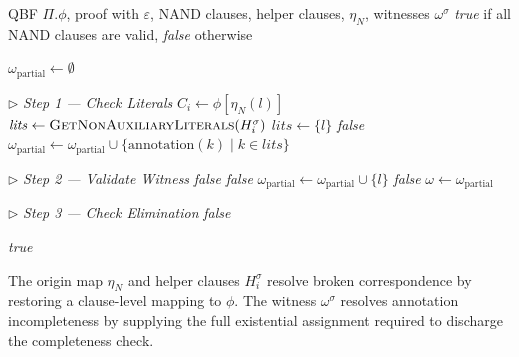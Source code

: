 \documentclass{article}
\begin{document}
\begin{algorithm}
    \caption{\textsc{CheckExpansion}}
    \begin{algorithmic}[1]
        \REQUIRE QBF $\Pi.\phi$, proof with $\varepsilon$, NAND clauses, helper
        clauses, $\eta_N$, witnesses $\omega^\sigma$
        \ENSURE \textit{true} if all NAND clauses are valid, \textit{false} otherwise


        \STATE $\omega_{\mathrm{partial}} \leftarrow \emptyset$

        \STATE $\triangleright$ \textit{Step 1 --- Check Literals}
        \STATE $C_i \leftarrow \phi[\eta_N(l)]$
        \STATE $\mathit{lits} \leftarrow \textsc{GetNonAuxiliaryLiterals}(H_i^\sigma)$
        \ELSE
        \STATE $\mathit{lits} \leftarrow \{l\}$
        \ENDIF
        \RETURN \textit{false}
        \ENDIF
        \STATE $\omega_{\mathrm{partial}} \leftarrow \omega_{\mathrm{partial}}
            \cup \{\mathrm{annotation}(k) \mid k \in \mathit{lits}\}$
        \ENDFOR

        \STATE $\triangleright$ \textit{Step 2 --- Validate Witness}
        \RETURN \textit{false}
        \ENDIF
        \RETURN \textit{false}
        \ENDIF
        \STATE $\omega_{\mathrm{partial}} \leftarrow \omega_{\mathrm{partial}} \cup \{l\}$
        \ENDFOR
        \RETURN \textit{false}
        \ENDIF
        \STATE $\omega \leftarrow \omega_{\mathrm{partial}}$

        \STATE $\triangleright$ \textit{Step 3 --- Check Elimination}
        \RETURN \textit{false}
        \ENDIF
        \ENDFOR

        \ENDFOR
        \RETURN \textit{true}
    \end{algorithmic}
\end{algorithm}

The origin map $\eta_N$ and helper clauses $H_i^\sigma$ resolve broken
correspondence by restoring a clause-level mapping to $\phi$. The witness
$\omega^\sigma$ resolves annotation incompleteness by supplying the full
existential assignment required to discharge the completeness check.
\end{document}

